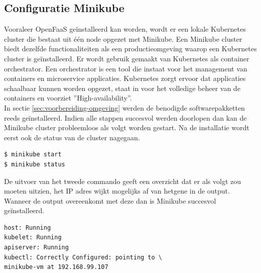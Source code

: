 \subsection{Configuratie Minikube}
\label{sec:configuratie-minikube}
Vooraleer OpenFaaS geïnstalleerd kan worden, wordt er een lokale Kubernetes cluster die bestaat uit één node opgezet met Minikube. Een Minikube cluster biedt dezelfde functionaliteiten als een productieomgeving waarop een Kubernetes cluster is geïnstalleerd. Er wordt gebruik gemaakt van Kubernetes als container orchestrator. Een orchestrator is een tool die instaat voor het management van containers en microservice applicaties. Kubernetes zorgt ervoor dat applicaties schaalbaar kunnen worden opgezet, staat in voor het volledige beheer van de containers en voorziet ''High-availability''.
\\
In sectie \ref{sec:voorbereiding-omgeving} werden de benodigde softwarepakketten reeds geïnstalleerd. Indien alle stappen succesvol werden doorlopen dan kan de Minikube cluster probleemloos als volgt worden gestart. Na de installatie wordt eerst ook de status van de cluster nagegaan.

\begin{lstlisting}[language=bash]
$ minikube start
$ minikube status
\end{lstlisting}

De uitvoer van het tweede commando geeft een overzicht dat er als volgt zou moeten uitzien, het IP adres wijkt mogelijks af van hetgene in de output. Wanneer de output overeenkomt met deze dan is Minikube succesvol geïnstalleerd.
\begin{lstlisting}[language=bash]
host: Running
kubelet: Running
apiserver: Running
kubectl: Correctly Configured: pointing to \ 
minikube-vm at 192.168.99.107
\end{lstlisting}

